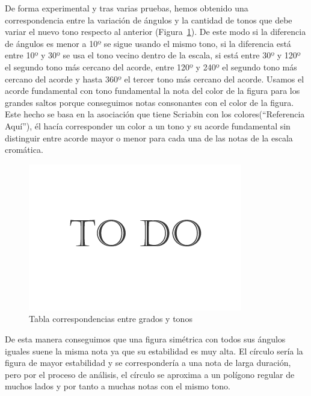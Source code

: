 De forma experimental y tras varias pruebas, hemos obtenido una correspondencia entre la variación de ángulos y la cantidad de tonos que debe variar el nuevo tono respecto al anterior (Figura~\ref{fig:Figura3Voz1}). De este modo si la diferencia de ángulos es menor a 10º se sigue usando el mismo tono, si la diferencia está entre 10º y 30º se usa el tono vecino dentro de la escala, si está entre 30º y 120º el segundo tono más cercano del acorde, entre 120º y 240º el segundo tono más cercano del acorde y hasta 360º el tercer tono más cercano del acorde. Usamos el acorde fundamental con tono fundamental la nota del color de la figura para los grandes saltos porque conseguimos notas consonantes con el color de la figura. Este hecho se basa en la asociación que tiene Scriabin con los colores(``Referencia Aquí''), él hacía corresponder un color a un tono y su acorde fundamental sin distinguir entre acorde mayor o menor para cada una de las notas de la escala cromática.

		\begin{figure}[htbp]
		\centering
		\hspace*{0.0in}
		\includegraphics[scale=0.57]{graphics/todo.png}
		\caption{Tabla correspondencias entre grados y tonos}
		\label{fig:Figura3Voz1}
		\end{figure}

De esta manera conseguimos que una figura simétrica con todos sus ángulos iguales suene la misma nota ya que su estabilidad es muy alta. El círculo sería la figura de mayor estabilidad y se correspondería a una nota de larga duración, pero por el proceso de análisis, el círculo se aproxima a un polígono regular de muchos lados y por tanto a muchas notas con el mismo tono.

